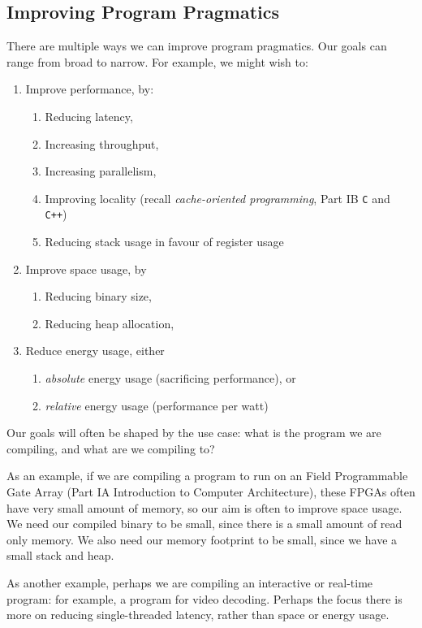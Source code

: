 \subsection{Improving Program Pragmatics}
There are multiple ways we can improve program pragmatics. Our goals can range from broad to narrow. For example, we might wish to:
\begin{enumerate}
    \item Improve performance, by:
    \begin{enumerate}
        \item Reducing latency,
        \item Increasing throughput,
        \item Increasing parallelism,
        \item Improving locality (recall \textit{cache-oriented programming}, \textsf{Part IB \texttt{C} and \texttt{C++}}) 
        \item Reducing stack usage in favour of register usage
    \end{enumerate}
    \item Improve space usage, by
    \begin{enumerate}
        \item Reducing binary size,
        \item Reducing heap allocation,
    \end{enumerate}
    \item Reduce energy usage, either
    \begin{enumerate}
        \item \textit{absolute} energy usage (sacrificing performance), or
        \item \textit{relative} energy usage (performance per watt)
    \end{enumerate}
\end{enumerate}
Our goals will often be shaped by the use case: what is the program we are compiling, and what are we compiling to?

As an example, if we are compiling a program to run on an Field Programmable Gate Array (\textsf{Part IA Introduction to Computer Architecture}), these FPGAs often have very small amount of memory, so our aim is often to improve space usage. We need our compiled binary to be small, since there is a small amount of read only memory. We also need our memory footprint to be small, since we have a small stack and heap. 

As another example, perhaps we are compiling an interactive or real-time program: for example, a program for video decoding. Perhaps the focus there is more on reducing single-threaded latency, rather than space or energy usage. 

